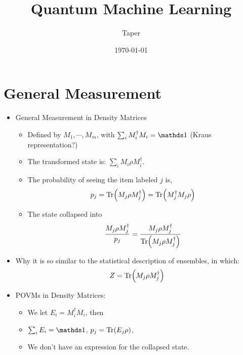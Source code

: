 \documentclass{article}
\title{Quantum Machine Learning}
\date{\today}
\author{Taper}
\begin{document}
\maketitle
{}
\tableofcontents

\section{General Measurement}
\label{sec:General Measurement}
\begin{itemize}
  \item General Measurement in Density Matrices
    \begin{itemize}
      \item Defined by $M_1,\cdots, M_m$, with $\sum_i M^\dagger_i M_i = \id$
        (Kraus representation?)
      \item The transformed state is: $\sum_i M_i \rho M_i^\dagger$.
      \item The probability of seeing the item labeled $j$ is,
        \begin{equation}
          p_j = \Tr(M_j \rho M_j^\dagger) = \Tr(M_j^\dagger M_j \rho)
        \end{equation}
      \item The state collapsed into
        \begin{equation}
          \frac{M_j \rho M_j^\dagger}{p_j} = 
          \frac{M_j \rho M_j^\dagger}{\Tr(M_j \rho M_j^\dagger)}
        \end{equation}
    \end{itemize}
  \item Why it is so similar to the statistical description of ensembles, in
    which:
    \begin{equation}
      Z = \Tr(M_j \rho M_j^\dagger)
    \end{equation}
   \item POVMs in Density Matrices:
     \begin{itemize}
       \item We let $E_i = M_i^\dagger M_i$, then
       \item $\sum_i E_i = \id$, $p_j = \Tr(E_j \rho)$,
       \item We don't have an expression for the collapsed state.
     \end{itemize}
\end{itemize}
\end{document}

